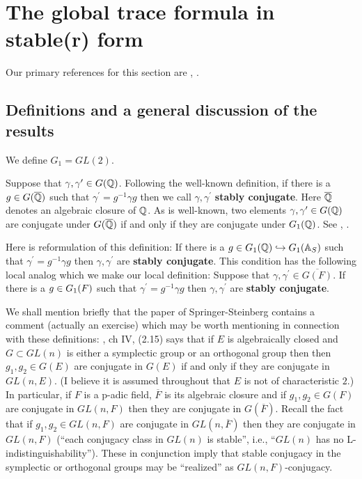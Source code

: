
\section{The global trace formula in stable(r) form}

Our primary references for this section are \cite{LL}, \cite{L3}.
\subsection{Definitions and a general discussion of the results}

We define $G_1=GL(2)$. 

Suppose that $\gamma ,\gamma ^{\prime }\in G({\Bbb{Q}})$. Following the
well-known definition, if there is a $g\in G(\overline{{\Bbb{Q}}})$ such that $%
\gamma ^{\prime }=g^{-1}\gamma g$ then we call $\gamma ,\gamma ^{\prime }$ 
\textbf{stably conjugate}. Here $\overline{{\Bbb{Q}}}$ denotes an algebraic
closure of ${\Bbb{Q}}$. As is well-known, two elements $\gamma ,\gamma
^{\prime }\in G({\Bbb{Q}})$ are conjugate under
$G(\overline{{\Bbb{Q}}})$ if and
only if they are conjugate under $G_1({\Bbb{Q}})$. See \cite{L3},
\cite{LL}.

Here is reformulation of this definition: If there is a
$g\in G_1({\Bbb{Q}})\hookrightarrow G_1({\Bbb{A}}_S)$ such
that $\gamma ^{\prime}=g^{-1}\gamma g$ then
$\gamma ,\gamma ^{\prime }$ are \textbf{stably conjugate}.
This condition has the following local analog which we make our
local definition:
Suppose that $\gamma ,\gamma ^{\prime }\in \overline{G(F)}$. If there
is a $g\in G_1(F\Bbb{)}$ such that 
$\gamma ^{\prime }=g^{-1}\gamma g$ then $\gamma ,\gamma ^{\prime }$ are 
\textbf{stably conjugate}.

\begin{remark}
We shall mention briefly that the paper of Springer-Steinberg
contains a comment (actually an exercise)
which may be worth mentioning in connection with
these definitions: \cite{SpSt}, ch IV, (2.15) says that if $E$ is
algebraically closed and $G\subset GL(n)$ is either a symplectic
group or an orthogonal group then then $g_1,g_2\in G(E)$ are
conjugate in $G(E)$ if and only if they are conjugate in $GL(n,E)$.
(I believe it is assumed throughout that $E$ is not of characteristic $2$.)
In particular, if $F$ is a p-adic field, $\overline{F}$ is its
algebraic closure and if $g_1,g_2\in G(F)$ are conjugate in
$GL(n,F)$ then they are conjugate in $G(\overline{F})$.
Recall the fact that if $g_1,g_2\in GL(n,F)$
are conjugate in $GL(n,\overline{F})$
then they are conjugate in $GL(n,{F})$ (``each conjugacy class
in $GL(n)$ is stable'', i.e., ``$GL(n)$ has no L-indistinguishability'').
These in conjunction imply that stable conjugacy in the
symplectic or orthogonal groups may be ``realized'' as
$GL(n,F)$-conjugacy.
\end{remark}


